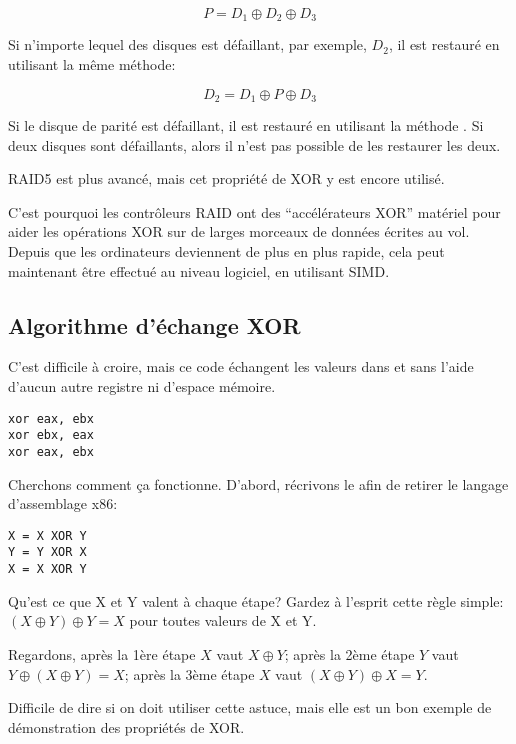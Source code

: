 \begin{equation} \label{eq:RAID4}
P = D_1 \oplus D_2 \oplus D_3
\end{equation}

Si n'importe lequel des disques est défaillant, par exemple, $D_2$, il est restauré
en utilisant la même méthode:

\begin{equation}
D_2 = D_1 \oplus P \oplus D_3
\end{equation}

Si le disque de parité est défaillant, il est restauré en utilisant la méthode .
Si deux disques sont défaillants, alors il n'est pas possible de les restaurer les
deux.

\ac{RAID}5 est plus avancé, mais cet propriété de XOR y est encore utilisé.

C'est pourquoi les contrôleurs \ac{RAID} ont des ``accélérateurs XOR'' matériel
pour aider les opérations XOR sur de larges morceaux de données écrites au vol.
Depuis que les ordinateurs deviennent de plus en plus rapide, cela peut maintenant
être effectué au niveau logiciel, en utilisant \ac{SIMD}.

\subsection{Algorithme d'échange XOR}

C'est difficile à croire, mais ce code échangent les valeurs dans \EAX et \EBX sans
l'aide d'aucun autre registre ni d'espace mémoire.

\begin{lstlisting}[style=customasmx86]
xor eax, ebx
xor ebx, eax
xor eax, ebx
\end{lstlisting}

Cherchons comment ça fonctionne.
D'abord, récrivons le afin de retirer le langage d'assemblage x86:

\begin{lstlisting}
X = X XOR Y
Y = Y XOR X
X = X XOR Y
\end{lstlisting}

Qu'est ce que X et Y valent à chaque étape?
Gardez à l'esprit cette règle simple: $(X \oplus Y) \oplus Y = X$ pour toutes valeurs
de X et Y.

Regardons,
après la 1ère étape $X$ vaut $X \oplus Y$;
après la 2ème étape $Y$ vaut $Y \oplus (X \oplus Y) = X$;
après la 3ème étape $X$ vaut $(X \oplus Y) \oplus X = Y$.

Difficile de dire si on doit utiliser cette astuce, mais elle est un bon exemple de
démonstration des propriétés de XOR.

